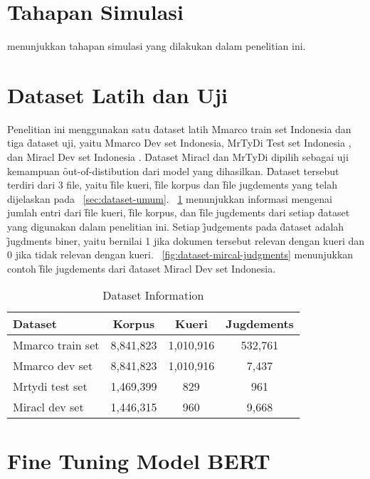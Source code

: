 \section{Tahapan Simulasi}
\label{sec:simulasi}

menunjukkan tahapan simulasi yang dilakukan dalam penelitian ini.

\section{Dataset Latih dan Uji}
\label{sec:dataset}

Penelitian ini menggunakan satu \f{dataset} latih Mmarco train set Indonesia \citep{mmarco} dan tiga \f{dataset} uji, yaitu Mmarco Dev set Indonesia, MrTyDi Test set Indonesia \citep{mrtydi}, dan Miracl Dev set Indonesia \citep{miracl}. \f{Dataset} Miracl dan MrTyDi dipilih sebagai uji kemampuan \f{out-of-distibution} dari model yang dihasilkan. \f{Dataset} tersebut terdiri dari 3 file, yaitu \f{file} kueri, \f{file korpus} dan \f{file jugdements} yang telah dijelaskan pada \sect~\ref{sec:dataset-umum}. \tab~\ref{tab:dataset-info} menunjukkan informasi mengenai jumlah entri dari \f{file} kueri, \f{file korpus}, dan \f{file jugdements} dari setiap \f{dataset} yang digunakan dalam penelitian ini. Setiap \f{judgements} pada \f{dataset} adalah \f{jugdments} biner, yaitu bernilai 1 jika dokumen tersebut relevan dengan kueri dan 0 jika tidak relevan dengan kueri. \pic~\ref{fig:dataset-mircal-judgments} menunjukkan contoh \f{file jugdements} dari \f{dataset} Miracl Dev set Indonesia.

\begin{table}[!ht]
    \centering
    \caption{Dataset Information}
    \label{tab:dataset-info}
    \begin{tabular}{|l|c|c|c|} \hline 
        \textbf{Dataset} & \textbf{Korpus} & \textbf{Kueri} & \textbf{Jugdements} \\ \hline 
        Mmarco train set & 8,841,823 & 1,010,916 & 532,761 \\ \hline
        Mmarco dev set & 8,841,823 & 1,010,916 & 7,437 \\ \hline
        Mrtydi test set & 1,469,399 & 829 & 961 \\ \hline
        Miracl dev set & 1,446,315 & 960 & 9,668 \\ \hline
    \end{tabular}
\end{table}

\section{Fine Tuning Model BERT}
\label{sec:finetuning}


